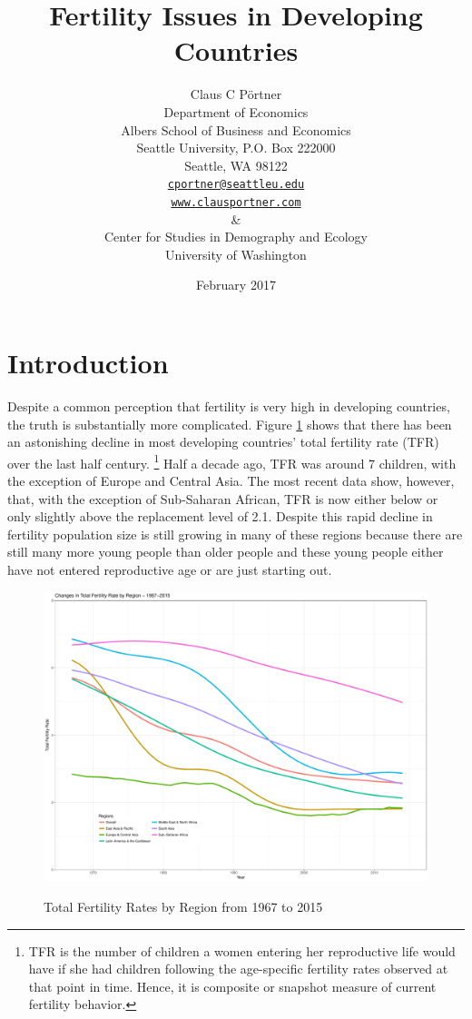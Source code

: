 \documentclass[letterpaper,12pt]{article}
\title{Fertility Issues in Developing Countries}
\author{Claus C P\"ortner\\
    Department of Economics\\
    Albers School of Business and Economics\\
    Seattle University, P.O. Box 222000\\
    Seattle, WA 98122\\
    \href{mailto:cportner@seattleu.edu}{\texttt{cportner@seattleu.edu}}\\
    \href{http://www.clausportner.com}{\texttt{www.clausportner.com}}\\
    \& \\
    Center for Studies in Demography and Ecology \\
    University of Washington\\ \vspace{2cm}
    }
\date{February 2017}
\begin{document}
\graphicspath{{../figures/}}

\maketitle
\thispagestyle{empty}


\newpage

\section{Introduction}

Despite a common perception that fertility is very high in developing countries,
the truth is substantially more complicated.
Figure \ref{fig:TFR} shows that there has been an astonishing decline in 
most developing countries' total fertility rate (TFR) over the last half 
century.%
\footnote{
TFR is the number of children a women entering her reproductive life
would have if she had children following the age-specific fertility
rates observed at that point in time.
Hence, it is composite or snapshot measure of current fertility
behavior.
}
Half a decade ago, TFR was around 7 children, with the exception
of Europe and Central Asia.
The most recent data show, however, that, with the exception of 
Sub-Saharan African, TFR is now either below or only slightly 
above the replacement level of 2.1.
Despite this rapid decline in fertility population size is still
growing in many of these regions because there are still many
more young people than older people and these young people either
have not entered reproductive age or are just starting out.

\begin{figure}[hp]
    \centering
    \caption{Total Fertility Rates by Region from 1967 to 2015}
    \includegraphics[width=0.75\linewidth]{totalFertilityRates}
    \label{fig:TFR}
\end{figure}
\end{document}
